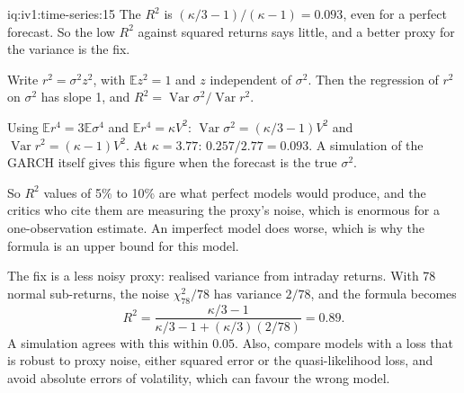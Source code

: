 \begin{solution}{iq:iv1:time-series:15}
The $R^2$ is $(\kappa/3 - 1)/(\kappa - 1) = 0.093$, even for a perfect forecast. So the low $R^2$ against squared returns says little, and a better proxy for the variance is the fix.

Write $r^2 = \sigma^2z^2$, with $\mathbb{E}z^2 = 1$ and $z$ independent of $\sigma^2$. Then the regression of $r^2$ on $\sigma^2$ has slope 1, and $R^2 = \operatorname{Var}\sigma^2/\operatorname{Var}r^2$.

Using $\mathbb{E}r^4 = 3\mathbb{E}\sigma^4$ and $\mathbb{E}r^4 = \kappa V^2$: $\operatorname{Var}\sigma^2 = (\kappa/3 - 1)V^2$ and $\operatorname{Var}r^2 = (\kappa - 1)V^2$. At $\kappa = 3.77$: $0.257/2.77 = 0.093$. A simulation of the GARCH itself gives this figure when the forecast is the true $\sigma^2$.

So $R^2$ values of 5\% to 10\% are what perfect models would produce, and the critics who cite them are measuring the proxy's noise, which is enormous for a one-observation estimate. An imperfect model does worse, which is why the formula is an upper bound for this model.

The fix is a less noisy proxy: realised variance from intraday returns. With 78 normal sub-returns, the noise $\chi^2_{78}/78$ has variance $2/78$, and the formula becomes
\[
R^2 = \frac{\kappa/3 - 1}{\kappa/3 - 1 + (\kappa/3)(2/78)} = 0.89.
\]
A simulation agrees with this within $0.05$. Also, compare models with a loss that is robust to proxy noise, either squared error or the quasi-likelihood loss, and avoid absolute errors of volatility, which can favour the wrong model.



\end{solution}


